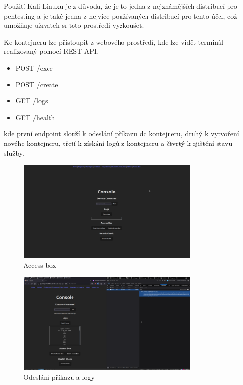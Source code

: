 \documentclass[12pt, a4paper,
oneside,      %
openright
]{report}
\begin{document}
Použití Kali Linuxu je z důvodu, že je to jedna z nejznámějších distribucí pro pentesting a je také jedna z nejvíce používaných distribucí pro tento účel, což umožňuje uživateli si toto prostředí vyzkoušet.

Ke kontejneru lze přistoupit z webového prostředí, kde lze vidět terminál realizovaný pomocí REST API.
\begin{itemize}
	\item POST /exec
	\item POST /create
	\item GET /logs
	\item GET /health
\end{itemize}
kde první endpoint slouží k odeslání příkazu do kontejneru, druhý k vytvoření nového kontejneru, třetí k získání logů z kontejneru a čtvrtý k zjištění stavu služby.

\begin{figure}[h]
	\centering
	\includegraphics[width=0.8\textwidth]{08-access.png}
	\caption{Access box}
	\label{fig:frontend-access}
\end{figure}

\begin{figure}[h]
	\centering
	\includegraphics[width=0.8\textwidth]{09-command.png}
	\caption{Odeslání příkazu a logy}
	\label{fig:frontend-command}
\end{figure}
\end{document}
